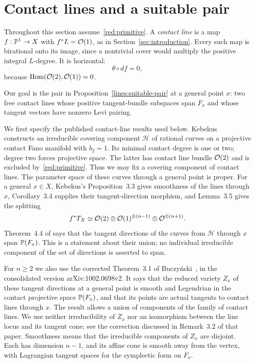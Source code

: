 \section{Contact lines and a suitable pair}
\label{lines:section}

Throughout this section assume~\eqref{red:primitive}. A
\emph{contact line} is a map $f:\mathbb P^1\to X$ with $f^*L=\mathcal O(1)$,
as in Section~\ref{sec:introduction}.
Every such map is birational onto its image, since a nontrivial
cover would multiply the positive integral $L$-degree. It is
horizontal:
\begin{equation}\label{lines:horizontal}
\theta\circ df=0,
\end{equation}
because $\operatorname{Hom}(\mathcal O(2),\mathcal O(1))=0$.

Our goal is the pair in Proposition~\ref{lines:suitable-pair} at a general
point $x$: two free contact lines whose positive tangent-bundle subspaces
span $F_x$ and whose tangent vectors have nonzero Levi pairing.

We first specify the published contact-line results used below.
Kebekus~\cite[Section~2.3]{Kebekus2001} constructs an irreducible covering
component $\mathcal H$ of rational curves on a projective contact
Fano manifold with $b_2=1$. Its minimal contact degree is one or two;
degree two forces projective space. The latter has contact line bundle
$\mathcal O(2)$ and is excluded by~\eqref{red:primitive}. Thus we may fix
a covering component of contact lines. The parameter space of
these curves through a general point is proper. For a general
$x\in X$, Kebekus's Proposition~3.3 gives smoothness of the lines
through $x$, Corollary~3.4 supplies their tangent-direction morphism,
and Lemma~3.5 gives the splitting
\begin{equation}\label{lines:standard-splitting}
f^*T_X\simeq
\mathcal O(2)\oplus\mathcal O(1)^{\oplus(n-1)}\oplus\mathcal O^{\oplus(n+1)}.
\end{equation}
Theorem~4.4 of \cite{Kebekus2001} says that the tangent directions
of the curves from $\mathcal H$ through $x$ span $\mathbb P(F_x)$.
This is a statement about their union; no individual irreducible
component of the set of directions is asserted to span.

For $n\geq2$ we also use the corrected Theorem~3.1 of
Buczy\'nski~\cite{Buczynski2010}, in the consolidated version
arXiv:1002.0698v2. It says that the reduced variety $Z_x$ of these
tangent directions at a general point is smooth and Legendrian
in the contact projective space $\mathbb P(F_x)$, and that its points
are actual tangents to contact lines through $x$. The result
allows a union of components of the family of contact lines.
We use neither irreducibility of $Z_x$ nor an isomorphism between
the line locus and its tangent cone; see the correction discussed
in Remark~3.2 of that paper. Smoothness means that the irreducible
components of $Z_x$ are disjoint. Each has dimension $n-1$, and
its affine cone is smooth away from the vertex, with Lagrangian
tangent spaces for the symplectic form on $F_x$.

